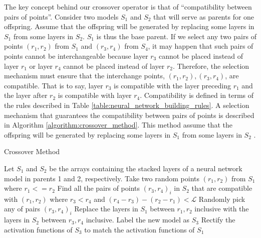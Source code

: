 \documentclass[12pt]{elsart}%
\begin{document}
The key concept behind our crossover operator is that of  ``compatibility between pairs of points''. Consider two models $S_1$ and $S_2$ that will serve as parents for one offspring. Assume that the offspring will be generated by replacing some layers in $S_1$ from some layers in $S_2$.  $S_1$ is thus the base parent. If we select any two pairs of points $(r_1, r_2)$ from $S_1$ and $(r_3, r_4)$ from $S_4$, it may happen that such pairs of points cannot be interchangeable because layer $r_3$ cannot be placed instead of layer $r_1$ or layer $r_4$ cannot be placed instead of layer $r_2$. Therefore, the selection mechanism must ensure that the interchange points, $(r_1, r_2), (r_3, r_4)$, are compatible. That is to say, layer $r_3$ is compatible with the layer preceding $r_1$ and the layer after $r_2$ is compatible with layer $r_4$. Compatibility is defined in terms of the rules described in Table \ref{table:neural_network_building_rules}. A selection mechanism that guarantees the compatibility between pairs of points is described in Algorithm \ref{algorithm:crossover_method}. This method assume that the offspring will be generated by replacing some layers in $S_1$ from some layers in $S_2$ .

\begin{algorithm}[!htb]
\caption{Crossover Method}
\begin{algorithmic}
\State Let $S_1$ and $S_2$ be the arrays containing the stacked layers of a neural network model in parents 1 and 2, respectively.
\State Take two random points $(r_1, r_2)$ from $S_1$ where $r_1 <= r_2 $
\Else 
\EndIf
\State Find all the pairs of points $(r_3, r_4)_i$ in $S_2$ that are compatible with $(r_1, r_2)$ where $r_3 < r_4$ and $(r_4 - r_3) - (r_2 - r_1) < \mathcal{L}$
\State Randomly pick any of pairs $(r_3, r_4)_i$
\State Replace the layers in $S_1$ between $r_1, r_2$ inclusive with the layers in $S_2$ between $r_3, r_4$ inclusive. Label the new model as $S_3$
\State Rectify the activation functions of $S_3$ to match the activation functions of $S_1$
\end{algorithmic}
\label{algorithm:crossover_method}
\end{algorithm}
\end{document}

